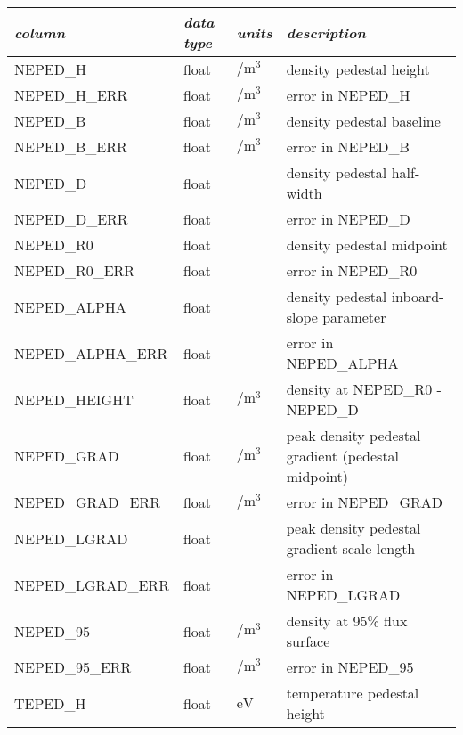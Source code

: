 \begin{table*}[h]
 \pushtooutside
 {\begin{tabu} to 143mm {X[2.348,l]X[1,c]X[1,c]X[4.348,c]}
   \toprule
   \emph{column} &
   \emph{data type} &
   \emph{units} &
   \emph{description}
   \\
   \midrule
   NEPED\_H &
   float &
   $\si{\per\meter\cubed}$ &
   density pedestal height
   \\
   NEPED\_H\_ERR &
   float &
   $\si{\per\meter\cubed}$ &
   error in NEPED\_H
   \\
   NEPED\_B &
   float &
   $\si{\per\meter\cubed}$ &
   density pedestal baseline
   \\
   NEPED\_B\_ERR &
   float &
   $\si{\per\meter\cubed}$ &
   error in NEPED\_B
   \\
   NEPED\_D &
   float &
   &
   density pedestal half-width
   \\
   NEPED\_D\_ERR &
   float &
   &
   error in NEPED\_D
   \\
   NEPED\_R0 &
   float &
   &
   density pedestal midpoint
   \\
   NEPED\_R0\_ERR &
   float &
   &
   error in NEPED\_R0
   \\
   NEPED\_ALPHA &
   float &
   &
   density pedestal inboard-slope parameter
   \\
   NEPED\_ALPHA\_ERR &
   float &
   &
   error in NEPED\_ALPHA
   \\
   NEPED\_HEIGHT &
   float &
   $\si{\per\meter\cubed}$ &
   density at NEPED\_R0 - NEPED\_D 
   \\
   NEPED\_GRAD &
   float &
   $\si{\per\meter\cubed}$ &
   peak density pedestal gradient (pedestal midpoint)
   \\
   NEPED\_GRAD\_ERR &
   float &
   $\si{\per\meter\cubed}$ &
   error in NEPED\_GRAD
   \\
   NEPED\_LGRAD &
   float &
   &
   peak density pedestal gradient scale length
   \\
   NEPED\_LGRAD\_ERR &
   float &
   &
   error in NEPED\_LGRAD
   \\
   NEPED\_95 &
   float &
   $\si{\per\meter\cubed}$ &
   density at 95\% flux surface
   \\
   NEPED\_95\_ERR &
   float &
   $\si{\per\meter\cubed}$ &
   error in NEPED\_95
   \\
   TEPED\_H &
   float &
   $\si{\electronvolt}$ &
   temperature pedestal height
   \\

\end{tabu}}
\end{table*}
